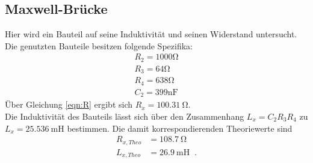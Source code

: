     \subsection{Maxwell-Brücke}
        Hier wird ein Bauteil auf seine Induktivität und seinen Widerstand untersucht. Die genutzten Bauteile besitzen folgende Spezifika:
        \begin{align*}
          R_2=1000\si{\ohm}\\
          R_3 = 64 \si{\ohm}\\
          R_4 = 638 \si{\ohm}\\
          C_2 = 399 \si{\nano\farad}
        \end{align*}
        Über Gleichung \ref{eqn:R} ergibt sich $R_x=\SI{100.31}{\ohm}$.\\
        Die Induktivität des Bauteils lässt sich über den Zusammenhang $L_x=C_2 R_3 R_4$ zu $L_x=\SI{25.536}{\milli\henry}$ bestimmen.
        Die damit korrespondierenden Theoriewerte sind
        \begin{align*}
            R_{x, Theo} &= \SI{108.7}{\ohm}\\
            L_{x, Theo} &= \SI{26.9}{\milli\henry}\; \; \text{.}
          \end{align*}


